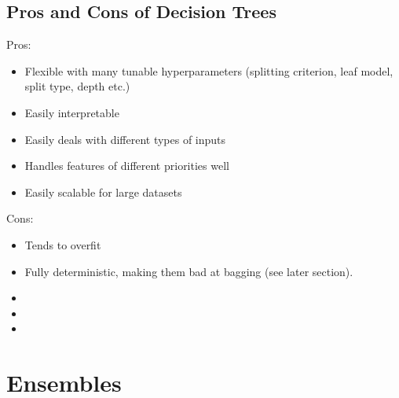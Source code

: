 \documentclass{report}
\begin{document}
\section{Pros and Cons of Decision Trees}
\begin{multicols}{2}
Pros:
\begin{itemize}
 \item Flexible with many tunable hyperparameters (splitting criterion, leaf model, split type, depth etc.)
 \item Easily interpretable
 \item Easily deals with different types of inputs
 \item Handles features of different priorities well
 \item Easily scalable for large datasets
\end{itemize}
Cons:
\begin{itemize}
 \item Tends to overfit
 \item Fully deterministic, making them bad at bagging (see later section).
 \item[\vspace{-1em}]
 \item[\vspace{-1em}]
 \item[\vspace{-1em}]
\end{itemize}
\end{multicols}
\chapter{Ensembles}
\end{document}
